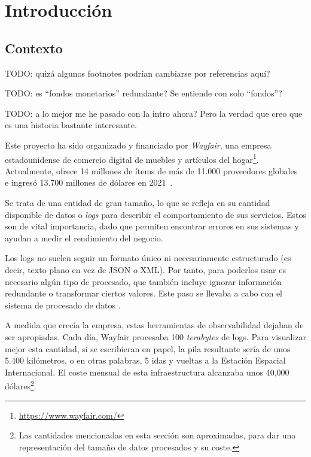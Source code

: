 
\chapter{Introducción}

\section{Contexto}

TODO: quizá algunos footnotes podrían cambiarse por referencias aquí?

TODO: es ``fondos monetarios'' redundante? Se entiende con solo ``fondos''?

TODO: a lo mejor me he pasado con la intro ahora? Pero la verdad que creo que es
una historia bastante interesante.

Este proyecto ha sido organizado y financiado por \emph{Wayfair}, una empresa
estadounidense de comercio digital de muebles y artículos del
hogar\footnote{\url{https://www.wayfair.com/}}. Actualmente, ofrece 14 millones
de ítems de más de 11.000 proveedores globales~\cite{wayfairItems} e ingresó
13.700 millones de dólares en 2021~\cite{wayfairRevenue}.

Se trata de una entidad de gran tamaño, lo que se refleja en su cantidad
disponible de datos o \emph{logs} para describir el comportamiento de sus
servicios. Estos son de vital importancia, dado que permiten encontrar errores
en sus sistemas y ayudan a medir el rendimiento del negocio.

Los logs no suelen seguir un formato único ni necesariamente estructurado (es
decir, texto plano en vez de JSON o XML). Por tanto, para poderlos usar es
necesario algún tipo de procesado, que también incluye ignorar información
redundante o transformar ciertos valores. Este paso se llevaba a cabo con el
sistema de procesado de datos \textcite{logstash}.

A medida que crecía la empresa, estas herramientas de observabilidad dejaban de
ser apropiadas. Cada día, Wayfair procesaba 100 \emph{terabytes} de logs. Para
visualizar mejor esta cantidad, si se escribieran en papel, la pila resultante
sería de unos 5.400 kilómetros, o en otras palabras, 5 idas y vueltas a la
Estación Espacial Internacional. El coste mensual de esta infraestructura
alcanzaba unos 40,000 dólares\footnote{Las cantidades mencionadas en esta
sección son aproximadas, para dar una representación del tamaño de datos
procesados y su coste.}.

